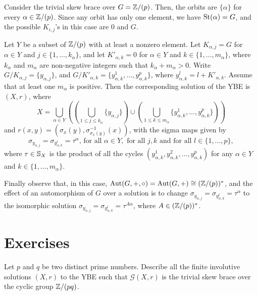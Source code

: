 \begin{example}\label{bracesp}
	{\rm Consider the trivial skew brace  over $G=\mathbb{Z}/(p)$. Then, the orbits
		are $\{\alpha\}$ for every $\alpha\in\mathbb{Z}/(p)$.
		Since any orbit has  only one element,  we have $\operatorname{St}(\alpha)=G$, and the possible $K_{i,j}$'s in this case are $0$ and $G$.
		
		Let $Y$ be a subset of $\mathbb{Z}/(p)$ with at least a nonzero element.
		Let $K_{\alpha,j}=G$ for $\alpha\in Y$ and $j\in\{1,\dots,k_{\alpha}\}$, and let $K'_{\alpha,k}=0$ for
		$\alpha\in Y$ and $k\in\{1,\dots,m_\alpha\}$, where $k_{\alpha}$ and $m_{\alpha}$ are non-negative integers such that $k_{\alpha}+m_{\alpha}>0$.
		Write $G/K_{\alpha,j}=\{y_{\alpha,j}\}$, and
		$G/K'_{\alpha,k}=\{y^1_{\alpha,k},\dots,y^p_{\alpha,k}\}$, where
		$y^{l}_{\alpha,k}=l+K'_{\alpha,k}$. Assume that at least one $m_{\alpha}$ is positive. Then the corresponding solution
		of the YBE is $(X,r)$, where
		$$
		X=\bigcup_{\alpha\in Y}\left( \left(\bigcup_{1\leq j\leq
			k_{\alpha}}\{ y_{\alpha,j}\}\right)\cup \left(\bigcup_{1\leq k\leq
			m_{\alpha}} \{y^1_{\alpha,k},\dots ,y^p_{\alpha,k}\}\right) \right)
		$$
		and $r(x,y)=(\sigma_x(y),\sigma^{-1}_{\sigma_{x}(y)}(x))$, with the
		sigma maps given by
		$$
		\sigma_{y_{\alpha,j}}=\sigma_{y^l_{\alpha,k}}=\tau^\alpha\text{, for
			all } \alpha\in Y,\text{ for all } j,k \text{ and for all }
		l\in\{1,\dots,p\},
		$$
		where $\tau\in \mathbb{S}_X$ is the product of all the cycles
		$(y^1_{\alpha,k},y^2_{\alpha,k},\dots,y^p_{\alpha,k})$ for any
		$\alpha\in Y$ and $k\in\{1,\dots,m_\alpha\}$.
		
		Finally observe that, in this case, $\operatorname{Aut}(G,+,\circ)=\operatorname{Aut}(G,+)\cong
		(\mathbb{Z}/(p))^*$, and the effect of an automorphism of $G$ over a
		solution is to change
		$\sigma_{y_{\alpha,j}}=\sigma_{y^l_{\alpha,k}}=\tau^\alpha$ to the
		isomorphic solution
		$\sigma_{y_{\alpha,j}}=\sigma_{y^l_{\alpha,k}}=\tau^{A\alpha}$,
		where $A\in(\mathbb{Z}/(p))^*$.}
\end{example}






\section{Exercises}

\begin{prob} Let $p$ and $q$ be two distinct prime numbers. Describe all the finite involutive solutions $(X,r)$ to the YBE such that $\mathcal{G}(X,r)$ is the trivial skew brace over the cyclic group $\mathbb{Z}/(pq)$.
\end{prob}

